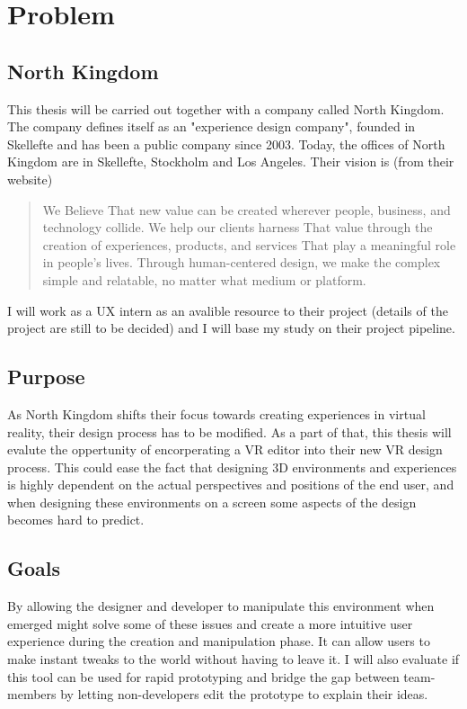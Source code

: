 \chapter{Problem}

\section{North Kingdom}
This thesis will be carried out together with a company called North Kingdom. The company defines itself as an "experience design company", founded in Skellefte and has been a public company since 2003. Today, the offices of North Kingdom are in Skellefte, Stockholm and Los Angeles. \cite{northkingdom} Their vision is (from their website)
\begin{quote}
We Believe That new value can be created wherever people, business, and technology collide. We help our clients harness That value through the creation of experiences, products, and services That play a meaningful role in people's lives. Through human-centered design, we make the complex simple and relatable, no matter what medium or platform. \cite{northkingdom}
\end{quote}
I will work as a UX intern as an avalible resource to their project (details of the project are still to be decided) and I will base my study on their project pipeline.

\section{Purpose}
As North Kingdom shifts their focus towards creating experiences in virtual reality, their design process has to be modified. As a part of that, this thesis will evalute the oppertunity of encorperating a VR editor into their new VR design process. This could ease the fact that designing 3D environments and experiences is highly dependent on the actual perspectives and positions of the end user, and when designing these environments on a screen some aspects of the design becomes hard to predict.

\section{Goals}
By allowing the designer and developer to manipulate this environment when emerged might solve some of these issues and create a more intuitive user experience during the creation and manipulation phase. It can allow users to make instant tweaks to the world without having to leave it. I will also evaluate if this tool can be used for rapid prototyping and bridge the gap between team-members by letting non-developers edit the prototype to explain their ideas.


